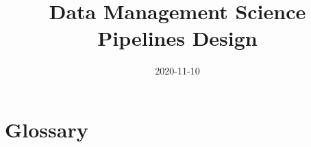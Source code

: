 \documentclass[DM,toc,lsstdraft]{lsstdoc}
\title{Data Management Science Pipelines Design}
\date{2020-11-10}
\begin{document}
\maketitle













\section{Glossary}
\end{document}

